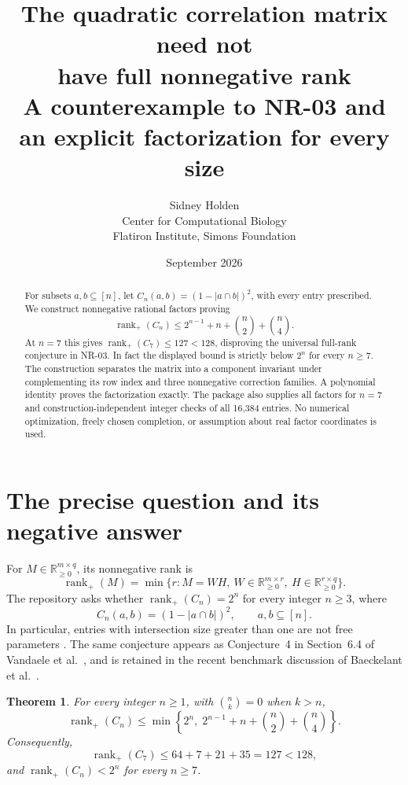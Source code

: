\documentclass[11pt]{article}
\title{\textbf{The quadratic correlation matrix need not\\have full nonnegative rank}\\[6pt]
\large A counterexample to NR-03 and an explicit factorization for every size}
\author{Sidney Holden\\[3pt]\small Center for Computational Biology\\\small Flatiron Institute, Simons Foundation}
\date{September 2026}
\newtheorem{theorem}{Theorem}
\DeclareMathOperator{\rank}{rank}
\newcommand{\rankp}{\rank_{+}}
\newcommand{\NN}{\mathbb R_{\ge0}}
\begin{document}
\maketitle
\thispagestyle{empty}
\begin{abstract}
For subsets $a,b\subseteq[n]$, let $C_n(a,b)=(1-|a\cap b|)^2$, with every entry prescribed. We construct nonnegative rational factors proving
\[
\rankp(C_n)\le 2^{n-1}+n+\binom n2+\binom n4.
\]
At $n=7$ this gives $\rankp(C_7)\le127<128$, disproving the universal full-rank conjecture in NR-03. In fact the displayed bound is strictly below $2^n$ for every $n\ge7$. The construction separates the matrix into a component invariant under complementing its row index and three nonnegative correction families. A polynomial identity proves the factorization exactly. The package also supplies all factors for $n=7$ and construction-independent integer checks of all 16,384 entries. No numerical optimization, freely chosen completion, or assumption about real factor coordinates is used.
\end{abstract}

\section{The precise question and its negative answer}

For $M\in\NN^{m\times q}$, its nonnegative rank is
\[
\rankp(M)=\min\{r:M=WH,\ W\in\NN^{m\times r},\ H\in\NN^{r\times q}\}.
\]
The repository asks whether $\rankp(C_n)=2^n$ for every integer $n\ge3$, where
\begin{equation}\label{eq:C}
C_n(a,b)=(1-|a\cap b|)^2,\qquad a,b\subseteq[n].
\end{equation}
In particular, entries with intersection size greater than one are not free parameters \cite{repo}. The same conjecture appears as Conjecture~4 in Section~6.4 of Vandaele et al.\ \cite{vggt}, and is retained in the recent benchmark discussion of Baeckelant et al.\ \cite{bvg}.

\begin{theorem}\label{thm:main}
For every integer $n\ge1$, with $\binom nk=0$ when $k>n$,
\begin{equation}\label{eq:bound}
\rankp(C_n)\le \min\left\{2^n,\;2^{n-1}+n+\binom n2+\binom n4\right\}.
\end{equation}
Consequently,
\[
\boxed{\rankp(C_7)\le 64+7+21+35=127<128,}
\]
and $\rankp(C_n)<2^n$ for every $n\ge7$.
\end{theorem}
\end{document}
